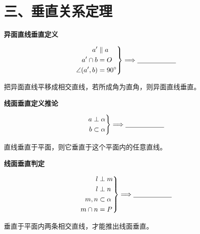 \documentclass{exam-zh}
\begin{document}
\section*{三、垂直关系定理}


\begin{question}[points=5]
  \textbf{异面直线垂直定义}\par
\[
\left.
\begin{aligned}
a'&\parallel a\\
a'\cap b&=O\\
\angle(a',b)&=90^\circ
\end{aligned}
\right\}
\Longrightarrow
\underline{\hspace{20mm}}
\]


  \paren[$a\perp b$]
  \begin{solutionblock}
    把异面直线平移成相交直线，若所成角为直角，则异面直线垂直。
  \end{solutionblock}
\end{question}



\begin{question}[points=5]
  \textbf{线面垂直定义推论}\par
\[
\left.
\begin{aligned}
a&\perp\alpha\\
b&\subset\alpha
\end{aligned}
\right\}
\Longrightarrow
\underline{\hspace{20mm}}
\]


  \paren[$a\perp b$]
  \begin{solutionblock}
    直线垂直于平面，则它垂直于这个平面内的任意直线。
  \end{solutionblock}
\end{question}



\begin{question}[points=5]
  \textbf{线面垂直判定}\par
\[
\left.
\begin{aligned}
l&\perp m\\
l&\perp n\\
m,n&\subset\alpha\\
m\cap n&=P
\end{aligned}
\right\}
\Longrightarrow
\underline{\hspace{20mm}}
\]


  \begin{solutionblock}
    垂直于平面内两条相交直线，才能推出线面垂直。
  \end{solutionblock}
\end{question}
\end{document}
